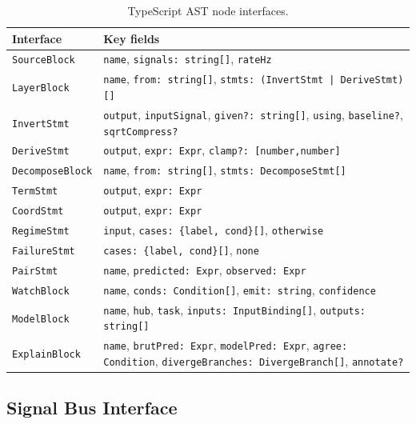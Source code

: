 \documentclass[10pt,twocolumn,a4paper]{article}
\theoremstyle{definition}
\theoremstyle{remark}
\begin{document}
\begin{table}[H]
\centering
\caption{TypeScript AST node interfaces.}
\label{tab:ast}
\footnotesize
\begin{tabularx}{\columnwidth}{lX}
\toprule
\textbf{Interface} & \textbf{Key fields} \\
\midrule
\texttt{SourceBlock}   & \texttt{name}, \texttt{signals: string[]}, \texttt{rateHz} \\
\texttt{LayerBlock}    & \texttt{name}, \texttt{from: string[]}, \texttt{stmts: (InvertStmt | DeriveStmt)[]} \\
\texttt{InvertStmt}    & \texttt{output}, \texttt{inputSignal}, \texttt{given?: string[]}, \texttt{using}, \texttt{baseline?}, \texttt{sqrtCompress?} \\
\texttt{DeriveStmt}    & \texttt{output}, \texttt{expr: Expr}, \texttt{clamp?: [number,number]} \\
\texttt{DecomposeBlock}& \texttt{name}, \texttt{from: string[]}, \texttt{stmts: DecomposeStmt[]} \\
\texttt{TermStmt}      & \texttt{output}, \texttt{expr: Expr} \\
\texttt{CoordStmt}     & \texttt{output}, \texttt{expr: Expr} \\
\texttt{RegimeStmt}    & \texttt{input}, \texttt{cases: \{label, cond\}[]}, \texttt{otherwise} \\
\texttt{FailureStmt}   & \texttt{cases: \{label, cond\}[]}, \texttt{none} \\
\texttt{PairStmt}      & \texttt{name}, \texttt{predicted: Expr}, \texttt{observed: Expr} \\
\texttt{WatchBlock}    & \texttt{name}, \texttt{conds: Condition[]}, \texttt{emit: string}, \texttt{confidence} \\
\texttt{ModelBlock}    & \texttt{name}, \texttt{hub}, \texttt{task}, \texttt{inputs: InputBinding[]}, \texttt{outputs: string[]} \\
\texttt{ExplainBlock}  & \texttt{name}, \texttt{brutPred: Expr}, \texttt{modelPred: Expr}, \texttt{agree: Condition}, \texttt{divergeBranches: DivergeBranch[]}, \texttt{annotate?} \\
\bottomrule
\end{tabularx}
\end{table}

\subsection{Signal Bus Interface}
\end{document}

